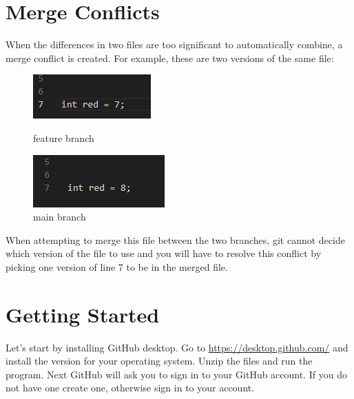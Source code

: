 \documentclass{article}
\begin{document}
\section{Merge Conflicts}

    When the differences in two files are too significant to automatically combine, a merge conflict is created. For example, these are two versions of the same file:
\begin{figure}
    \centering
    \includegraphics[width=0.5\linewidth]{image.png}
    \caption{feature branch}
    \includegraphics[width=0.5\linewidth]{File2.png}
    \caption{main branch}
\end{figure}
When attempting to merge this file between the two branches, git cannot decide which version of the file to use and you will have to resolve this conflict by picking one version of line 7 to be in the merged file. 

\section{Getting Started}

Let's start by installing GitHub desktop.  Go to \href{https://desktop.github.com/}{https://desktop.github.com/} and install the version for your operating system.  Unzip the files and run the program. Next GitHub will ask you to sign in to your GitHub account. If you do not have one create one, otherwise sign in to your account.
\end{document}
